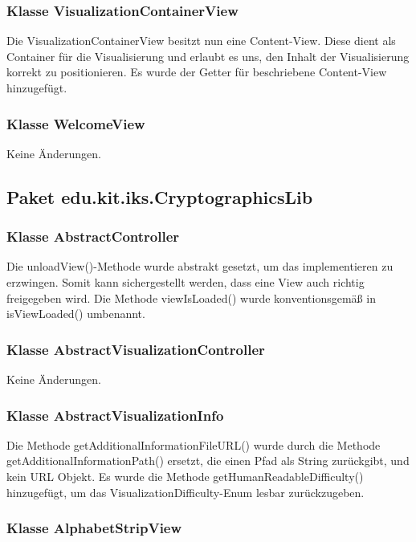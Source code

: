 \documentclass{article}
\begin{document}
    \subsubsection{Klasse VisualizationContainerView}
      Die VisualizationContainerView besitzt nun eine Content-View. Diese dient als Container für die Visualisierung
      und erlaubt es uns, den Inhalt der Visualisierung korrekt zu positionieren. Es wurde der Getter für
      beschriebene Content-View hinzugefügt.\newline

    \subsubsection{Klasse WelcomeView}
      Keine Änderungen.

  \subsection{Paket edu.kit.iks.CryptographicsLib}
    
  	\subsubsection{Klasse AbstractController}
  	
  	Die unloadView()-Methode wurde abstrakt gesetzt, um das implementieren zu erzwingen.
  	Somit kann sichergestellt werden, dass eine View auch richtig freigegeben wird. Die Methode
  	viewIsLoaded() wurde konventionsgemäß in isViewLoaded() umbenannt.

	\subsubsection{Klasse AbstractVisualizationController}
  Keine Änderungen.

	\subsubsection{Klasse AbstractVisualizationInfo}

	Die Methode getAdditionalInformationFileURL() wurde durch die Methode 
	getAdditionalInformationPath() ersetzt, die einen Pfad als String zurückgibt, und kein
	URL Objekt. Es wurde die Methode getHumanReadableDifficulty() hinzugefügt, um 
	das VisualizationDifficulty-Enum lesbar zurückzugeben.

	\subsubsection{Klasse AlphabetStripView}
	
\end{document}
